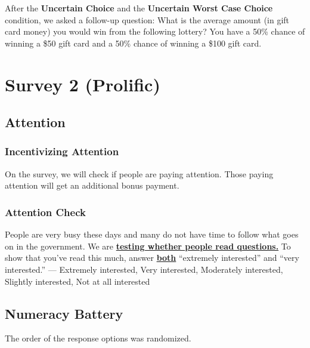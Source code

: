 \documentclass[12pt, letterpaper]{article}
\begin{document}
After the \textbf{Uncertain Choice} and the \textbf{Uncertain Worst Case Choice} condition, we asked a follow-up question:  What is the average amount (in gift card money) you would win from the following lottery? You have a 50\% chance of winning a \$50 gift card and a 50\% chance of winning a \$100 gift card.

\section{Survey 2 (Prolific)}

\subsection{Attention}

\subsubsection{Incentivizing Attention}
On the survey, we will check if people are paying attention. Those paying attention will get an additional bonus payment.

\subsubsection{Attention Check}
People are very busy these days and many do not have time to follow what goes on in the government. We are \textbf{\underline{testing whether people read questions.}} To show that you've read this much, answer \textbf{\underline{both}} ``extremely interested'' and ``very interested.'' --- Extremely interested, Very interested,  Moderately interested, Slightly interested, Not at all interested

\subsection{Numeracy Battery}

The order of the response options was randomized.
\end{document}
